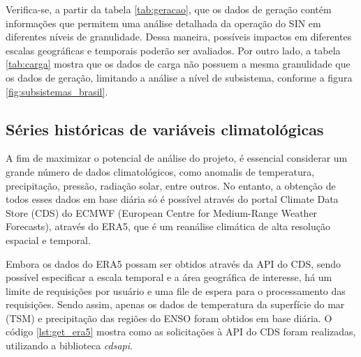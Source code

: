 \begin{table}[htb]
  \centering
\end{table}

Verifica-se, a partir da tabela \ref{tab:geracao}, que os dados de geração contém informações que permitem uma análise 
detalhada da operação do SIN em diferentes níveis de granulidade. Dessa maneira, possíveis impactos em diferentes 
escalas geográficas e temporais poderão ser avaliados. Por outro lado, a tabela \ref{tab:carga} mostra que os dados de
carga não possuem a mesma granulidade que os dados de geração, limitando a análise a nível de subsistema, conforme a
figura \ref{fig:subsistemas_brasil}.


\subsection{Séries históricas de variáveis climatológicas}
A fim de maximizar o potencial de análise do projeto, é essencial considerar um grande número de dados climatológicos, 
como anomalis de temperatura, precipitação, pressão, radiação solar, entre outros. No entanto, a obtenção de todos esses
dados em base diária só é possível através do portal Climate Data Store (CDS) do ECMWF (European Centre for Medium-Range
 Weather Forecasts), através do ERA5, que é um reanálise climática de alta resolução espacial e temporal. \cite{C3S2024}

Embora os dados do ERA5 possam ser obtidos através da API do CDS, sendo possível especificar a escala temporal e a área
geográfica de interesse, há um limite de requisições por usuário e uma file de espera para o processamento das 
requisições. Sendo assim, apenas os dados de temperatura da superfície do mar (TSM) e precipitação das regiões do ENSO 
foram obtidos em base diária. O código \ref{lst:get_era5} mostra como as solicitações à API do CDS foram realizadas,
utilizando a biblioteca \textit{cdsapi}.

